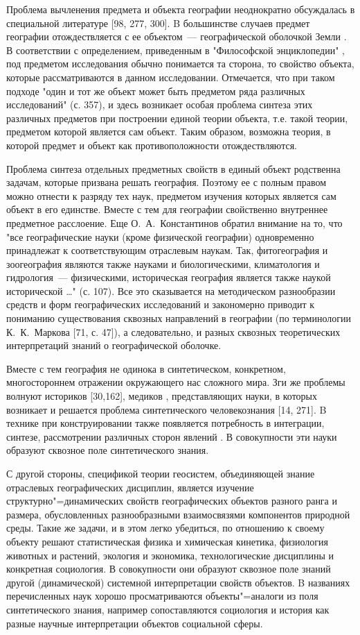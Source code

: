 \documentclass[draft,openany,14pt]{extbook}
\begin{document}
Проблема вычленения предмета и объекта географии неоднократно обсуждалась в специальной литературе [98, 277, 300]. B большинстве случаев предмет географии отождествляется с ее объектом~--- географической оболочкой Земли \cite{b284}. В соответствии с определением, приведенным в "Философской энциклопедии" \cite{b441}, под предметом исследования обычно понимается та сторона, то свойство объекта, которые рассматриваются в данном исследовании. Отмечается, что при таком подходе "один и тот же объект может быть предметом ряда различных исследований" (с. 357), и здесь возникает особая проблема синтеза этих различных предметов при построении единой теории объекта, т.е. такой теории, предметом которой является сам объект. Таким образом, возможна теория, в которой предмет и объект как противоположности отождествляются.

Проблема синтеза отдельных предметных свойств в единый объект родственна задачам, которые призвана решать география. Поэтому ее с полным правом можно отнести к разряду тех наук, предметом изучения которых является сам объект в его единстве. Вместе с тем для географии свойственно внутреннее предметное расслоение.  Еще О.~А.~Константинов \cite{b207} обратил внимание на то, что "все географические науки (кроме физической географии) одновременно принадлежат к соответствующим отраслевым наукам. Так, фитогеография и зоогеография являются также науками и биологическими, климатология и гидрология~--- физическими, историческая география является также наукой исторической \ldots{}" (с. 107). Все это сказывается на методическом разнообразии средств и форм географических исследований и закономерно приводит к пониманию существования сквозных направлений в географии (по терминологии К.~К.~Маркова [71, с. 47]), а следовательно, и разных сквозных теоретических интерпретаций знаний о географической оболочке.

Вместе с тем география не одинока в синтетическом, конкретном, многостороннем отражении окружающего нас сложного мира.  Зги же проблемы волнуют историков [30,162], медиков \cite{b464}, представляющих науки, в которых возникает и решается проблема синтетического человекознания [14, 271]. B технике при конструировании также появляется потребность в интеграции, синтезе, рассмотрении различных сторон явлений \cite{b326}. В совокупности эти науки образуют сквозное поле синтетического знания.

С другой стороны, спецификой теории геосистем, объединяющей знание отраслевых географических дисциплин, является изучение структурно"=динамических свойств географических объектов разного ранга и размера, обусловленных разнообразными взаимосвязями компонентов природной среды. Такие же задачи, и в этом легко убедиться, по отношению к своему объекту решают статистическая физика и химическая кинетика, физиология животных и растений, экология и экономика, технологические дисциплины и конкретная социология. В совокупности они образуют сквозное поле знаний другой (динамической) системной интерпретации свойств объектов. B названиях перечисленных наук хорошо просматриваются объекты"=аналоги из поля синтетического знания, например сопоставляются социология и история как разные научные интерпретации объектов социальной сферы.
\end{document}
